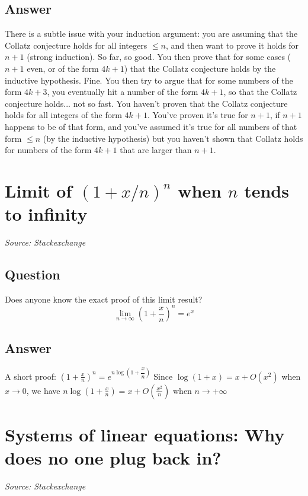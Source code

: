 \documentclass{article}
\begin{document}
\subsection*{Answer}
There is a subtle issue with your induction argument: you are assuming that the Collatz conjecture holds for all integers $\leq n$, and then want to prove it holds for $n+1$ (strong induction). So far, so good. You then prove that for some cases ($n+1$ even, or of the form $4k+1$) that the Collatz conjecture holds by the inductive hypothesis. Fine. You then try to argue that for some numbers of the form $4k+3$, you eventually hit a number of the form $4k+1$, so that the Collatz conjecture holds... not so fast. You haven't proven that the Collatz conjecture holds for all integers of the form $4k+1$. You've proven it's true for $n+1$, if $n+1$ happens to be of that form, and you've assumed it's true for all numbers of that form $\leq n$ (by the inductive hypothesis) but you haven't shown that Collatz holds for numbers of the form $4k+1$ that are larger than $n+1$.

\newpage

\section{Limit of $(1+ x/n)^n$ when $n$ tends to infinity}
\textit{Source: Stackexchange}

\subsection*{Question}
Does anyone know the exact proof of this limit result? $$\lim_{n\to\infty} \left(1+\frac{x}{n}\right)^n = e^x$$

\subsection*{Answer}
A short proof: $\left(1+\frac{x}{n}\right)^n = e^{n\log\left(1+\dfrac{x}{n}\right)}$ Since $\log(1+x) = x + O(x^2)$ when $x \to 0$, we have $n\log(1 + \frac{x}{n}) = x + O(\frac{x^2}{n})$ when $n\to +\infty$

\newpage

\section{Systems of linear equations: Why does no one plug back in?}
\textit{Source: Stackexchange}
\end{document}
